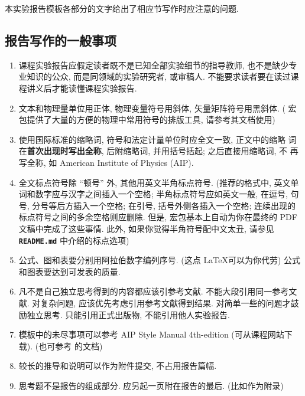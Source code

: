 \documentclass[font=default]{mpltx}
\newcommand{\note}[1]{{\color{gray}#1}}
\newcommand*\file[1]{\textbf{\texttt{#1}}}
\begin{document}
本实验报告模板各部分的文字给出了相应节写作时应注意的问题.

\subsection*{报告写作的一般事项}

\begin{enumerate}
  \item 课程实验报告应假定读者既不是已知全部实验细节的指导教师, 也不是缺少专业知识的公众, 而是同领域的实验研究者, 或审稿人.
        不能要求读者要在读过课程讲义后才能读懂课程实验报告.
  \item 文本和物理量单位用正体, 物理变量符号用斜体, 矢量矩阵符号用黑斜体.
        \note{( 宏包提供了大量的方便的物理中常用符号的排版工具, 请参考其文档使用)}
  \item 使用国际标准的缩略词, 符号和法定计量单位时应全文一致, 正文中的缩略
        词在\textbf{首次出现时写出全称}, 后附缩略词, 并用括号括起; 之后直接用缩略词, 不
        再写全称, 如 American Institute of Physics (AIP).
  \item 全文标点符号除 ``顿号'' 外, 其他用英文半角标点符号.
        \note{(推荐的格式中, 英文单词和数字应与汉字之间插入一个空格;
          半角标点符号应如英文一般, 在逗号, 句号, 分号等后方插入一个空格;
          在引号, 括号外侧各插入一个空格;
          连续出现的标点符号之间的多余空格则应删除.
          但是, \pkg{xeCJK} 宏包基本上自动为你在最终的 PDF 文稿中完成了这些事情.
          此外, 如果你觉得半角符号配中文太丑, 请参见 \file{README.md} 中介绍的标点选项)}
  \item 公式、图和表要分别用阿拉伯数字编列序号. \note{(这点 \LaTeX 可以为你代劳)}
        公式和图表要达到可发表的质量.
  \item 凡不是自己独立思考得到的内容都应该引参考文献.
        不能大段引用同一参考文献.
        对复杂问题, 应该优先考虑引用参考文献得到结果.
        对简单一些的问题才鼓励独立思考.
        只能引用正式出版物, 不能引用他人实验报告.
  \item 模板中的未尽事项可以参考 AIP Style Manual 4th-edition (可从课程网站下载).
        \note{(也可参考  的文档)}
  \item 较长的推导和说明可以作为附件提交, 不占用报告篇幅.
  \item 思考题不是报告的组成部分.
        应另起一页附在报告的最后. \note{(比如作为附录)}
\end{enumerate}
\end{document}
